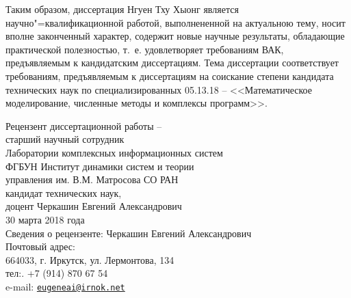 \documentclass[12pt]{extarticle}
\begin{document}
Таким образом, диссертация Нгуен Тху Хыонг является
научно"=квалификационной работой, выполнененной на актуальною тему, носит вполне законченный характер, содержит новые научные результаты, обладающие практической полезностью, т.~е. удовлетворяет требованиям ВАК, предъявляемым к кандидатским диссертациям.  Тема диссертации соответствует требованиям, предъявляемым к диссертациям на соискание степени кандидата технических наук по специализированных 05.13.18 -- <<Математическое моделирование, численные методы и комплексы программ>>.



\vspace{2em}
\noindent{}Рецензент диссертационной работы --\\
старший научный сотрудник\\
Лаборатории комплексных информационных систем\\
ФГБУН Институт динамики систем и теории\\
управления им. В.М. Матросова СО РАН\\
кандидат технических наук,\\
доцент \hfil Черкашин Евгений Александрович\linebreak{}{}\\[0.5em]
30 марта 2018 года\\[0.5em]

\noindent{}Сведения о рецензенте: Черкашин Евгений Александрович\\[0.5em]
Почтовый адрес:\\
664033, г. Иркутск, ул. Лермонтова, 134\\[0.2em]
тел:. +7 (914) 870 67 54\\[0.2em]
e-mail: \href{mailto:eugeneai@irnok.net}{\nolinkurl{eugeneai@irnok.net}}
\end{document}
